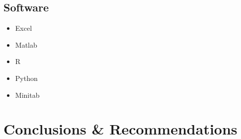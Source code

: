 \documentclass[11pt,a4paper,article]{memoir} %
\begin{document}
\section{Software}
\begin{itemize}
\item Excel
\item Matlab
\item R
\item Python
\item Minitab
\end{itemize}

\newpage


\chapter{Conclusions \& Recommendations}

\newpage
\appendix
\chapter{}

\end{document}
